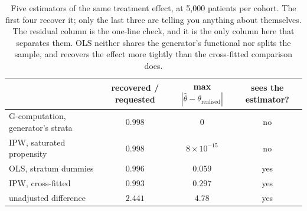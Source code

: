 \begin{table}[htbp]
\small
\centering
\caption{Five estimators of the same treatment effect, at 5{,}000 patients per
cohort. The first four recover it; only the last three are telling you anything
about themselves. The residual column is the one-line check, and it is the only
column here that separates them. OLS neither shares the generator's functional
nor splits the sample, and recovers the effect more tightly than the cross-fitted
comparison does.}
\label{tab:trial}
\begin{tabular}{@{}lccc@{}}
\toprule
& \textbf{recovered / requested} & \textbf{max $|\hat\theta - \theta_{\text{realised}}|$}
& \textbf{sees the estimator?} \\
\midrule
G-computation, generator's strata & $0.998$ & $0$          & no \\
IPW, saturated propensity         & $0.998$ & $8\times10^{-15}$ & no \\
OLS, stratum dummies              & $0.996$ & $0.059$      & yes \\
IPW, cross-fitted                 & $0.993$ & $0.297$      & yes \\
unadjusted difference             & $2.441$ & $4.78$       & yes \\
\bottomrule
\end{tabular}
\end{table}
